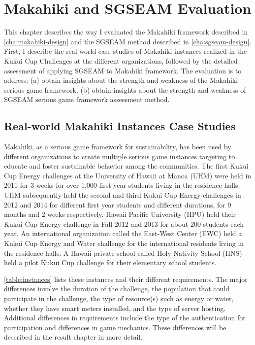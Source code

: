 \chapter{Makahiki and SGSEAM Evaluation}
\label{cha:evaluation}

This chapter describes the way I evaluated the Makahiki framework described in \autoref{cha:makahiki-design} and the SGSEAM method described in \autoref{cha:sgseam-design}. First, I describe the real-world case studies of Makahiki instances realized in the Kukui Cup Challenges at the different organizations, followed by the detailed assessment of applying SGSEAM to Makahiki framework. The evaluation is to address:
(a) obtain insights about the strength and weakness of the Makahiki serious game framework, (b) obtain insights about the strength and weakness of SGSEAM serious game framework assessment method.

\section{Real-world Makahiki Instances Case Studies}

Makahiki, as a serious game framework for sustainability, has been used by different organizations to create multiple serious game instances targeting to educate and foster sustainable behavior among the communities. The first Kukui Cup Energy challenges at the University of Hawaii at Manoa (UHM) were held in 2011 for 3 weeks for over 1,000 first year students living in the residence halls. UHM subsequently held the second and third Kukui Cup Energy challenges in 2012 and 2014 for different first year students and different durations, for 9 months and 2 weeks respectively. Hawaii Pacific University (HPU) held their Kukui Cup Energy challenge in Fall 2012 and 2013 for about 200 students each year. An international organization called the East-West Center (EWC) held a Kukui Cup Energy and Water challenge for the international residents living in the residence halls. A Hawaii private school called Holy Nativity School (HNS) held a pilot Kukui Cup challenge for their elementary school students. 

\autoref{table:instances} lists these instances and their different requirements. The major differences involve the duration of the challenge, the population that could participate in the challenge, the type of resource(s) such as energy or water, whether they have smart meters installed, and the type of server hosting. Additional differences in requirements include the type of the authentication for participation and differences in game mechanics. These differences will be described in the result chapter in more detail.


